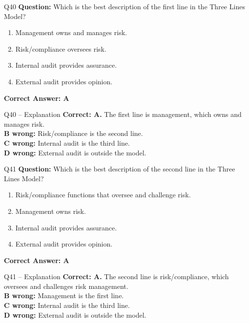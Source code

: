\documentclass[aspectratio=169,10pt]{beamer}
\begin{document}
	\begin{frame}[t]{Q40}
		\small
		\textbf{Question:} Which is the best description of the first line in the Three Lines Model?
		\begin{enumerate}[label=\Alph*.,itemsep=1pt,topsep=2pt]
			\item Management owns and manages risk.
			\item Risk/compliance oversees risk.
			\item Internal audit provides assurance.
			\item External audit provides opinion.
		\end{enumerate}
		\vspace{4pt}
		\textbf{Correct Answer: A}
	\end{frame}
	
	\begin{frame}[t]{Q40 -- Explanation}
		\small
		\textbf{Correct: A.} The first line is management, which owns and manages risk. \\[4pt]
		\textbf{B wrong:} Risk/compliance is the second line. \\[2pt]
		\textbf{C wrong:} Internal audit is the third line. \\[2pt]
		\textbf{D wrong:} External audit is outside the model.
	\end{frame}
	
	\begin{frame}[t]{Q41}
		\small
		\textbf{Question:} Which is the best description of the second line in the Three Lines Model?
		\begin{enumerate}[label=\Alph*.,itemsep=1pt,topsep=2pt]
			\item Risk/compliance functions that oversee and challenge risk.
			\item Management owns risk.
			\item Internal audit provides assurance.
			\item External audit provides opinion.
		\end{enumerate}
		\vspace{4pt}
		\textbf{Correct Answer: A}
	\end{frame}
	
	\begin{frame}[t]{Q41 -- Explanation}
		\small
		\textbf{Correct: A.} The second line is risk/compliance, which oversees and challenges risk management. \\[4pt]
		\textbf{B wrong:} Management is the first line. \\[2pt]
		\textbf{C wrong:} Internal audit is the third line. \\[2pt]
		\textbf{D wrong:} External audit is outside the model.
	\end{frame}
	
\end{document}
